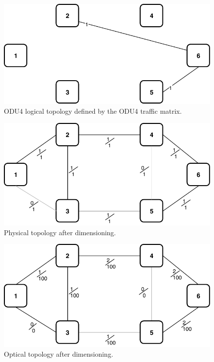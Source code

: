 \begin{figure}[h!]
\centering
\includegraphics[width=12cm]{sdf/ilp/opaque_survivability/figures/logical_topology_ODU4_low}
\caption{ODU4 logical topology defined by the ODU4 traffic matrix.}
\label{logical_ODU4_low}
\end{figure}

\begin{figure}[h!]
\centering
\includegraphics[width=12cm]{sdf/ilp/opaque_survivability/figures/physical_topology_low}
\caption{Physical topology after dimensioning.}
\label{physical_low}
\end{figure}

\begin{figure}[h!]
\centering
\includegraphics[width=13cm]{sdf/ilp/opaque_survivability/figures/optical_topology_low}
\caption{Optical topology after dimensioning.}
\label{optical_low}
\end{figure}

